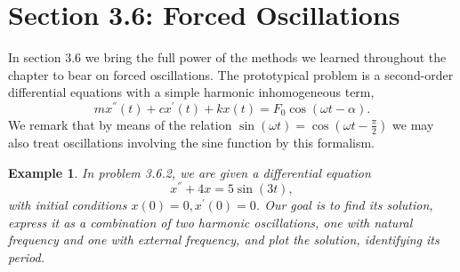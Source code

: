 \documentclass[11pt]{amsart}
\newtheorem{example}{Example}
\numberwithin{equation}{section}
\begin{document}
\section*{Section 3.6: Forced Oscillations}
In section 3.6 we bring the full power of the methods we learned throughout the chapter to bear on forced oscillations. The prototypical problem is a second-order differential equations with a simple harmonic inhomogeneous term, 
\begin{equation*}
mx^{''}(t)+cx^{'}(t)+kx(t) = F_0\cos(\omega t - \alpha).
\end{equation*}
We remark that by means of the relation $\sin(\omega t) = \cos\left(\omega t - \frac{\pi}{2}\right)$ we may also treat oscillations involving the sine function by this formalism. 

\begin{example}
In problem 3.6.2, we are given a differential equation
\begin{equation*}
x^{''}+4x=5\sin(3t),
\end{equation*}
with initial conditions $x(0)=0,x^{'}(0)=0$. Our goal is to find its solution, express it as a combination of two harmonic oscillations, one with natural frequency and one with external frequency, and plot the solution, identifying its period. 


\end{example}
\end{document}
